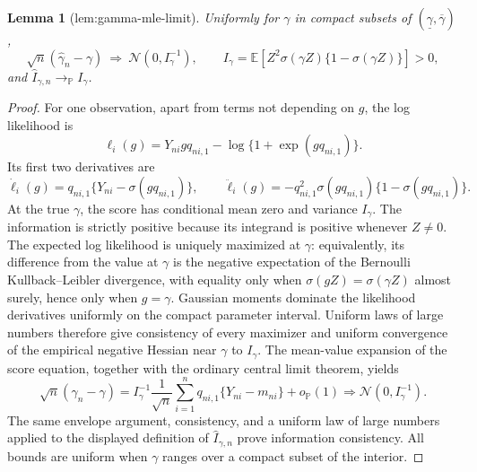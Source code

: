 \documentclass{article}
\newtheorem{lemma}{Lemma}
\begin{document}
\begin{lemma}[lem:gamma-mle-limit]\label{lem:gamma-mle-limit}
Uniformly for \(\gamma\) in compact subsets of \((\underline\gamma,\overline\gamma)\),
\[
 \sqrt n(\widehat\gamma_n-\gamma)\ \Rightarrow\ 
 \mathcal N(0,I_\gamma^{-1}),
 \qquad
 I_\gamma=\mathbb E[Z^2\sigma(\gamma Z)\{1-\sigma(\gamma Z)\}]>0,
\]
and \(\widehat I_{\gamma,n}\to_{\mathbb P}I_\gamma\).
\end{lemma}
\begin{proof}
For one observation, apart from terms not depending on \(g\), the log likelihood is
\[
 \ell_i(g)=Y_{ni}gq_{ni,1}-\log\{1+\exp(gq_{ni,1})\}.
\]
Its first two derivatives are
\[
 \dot\ell_i(g)=q_{ni,1}\{Y_{ni}-\sigma(gq_{ni,1})\},
 \qquad
 \ddot\ell_i(g)=-q_{ni,1}^2\sigma(gq_{ni,1})\{1-\sigma(gq_{ni,1})\}.
\]
At the true \(\gamma\), the score has conditional mean zero and variance \(I_\gamma\).  The information is strictly positive because its integrand is positive whenever \(Z\ne0\).  The expected log likelihood is uniquely maximized at \(\gamma\): equivalently, its difference from the value at \(\gamma\) is the negative expectation of the Bernoulli Kullback--Leibler divergence, with equality only when \(\sigma(gZ)=\sigma(\gamma Z)\) almost surely, hence only when \(g=\gamma\).  Gaussian moments dominate the likelihood derivatives uniformly on the compact parameter interval.  Uniform laws of large numbers therefore give consistency of every maximizer and uniform convergence of the empirical negative Hessian near \(\gamma\) to \(I_\gamma\).  The mean-value expansion of the score equation, together with the ordinary central limit theorem, yields
\[
 \sqrt n(\widehat\gamma_n-\gamma)
 =I_\gamma^{-1}\frac1{\sqrt n}\sum_{i=1}^n
 q_{ni,1}\{Y_{ni}-m_{ni}\}+o_{\mathbb P}(1)
 \Rightarrow\mathcal N(0,I_\gamma^{-1}).
\]
The same envelope argument, consistency, and a uniform law of large numbers applied to the displayed definition of \(\widehat I_{\gamma,n}\) prove information consistency.  All bounds are uniform when \(\gamma\) ranges over a compact subset of the interior.
\end{proof}
\end{document}
